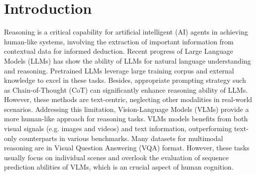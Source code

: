 \documentclass[11pt]{article}
\newcommand{\MY}[1]{\textcolor{orange}{(Mengyue: #1})}
\begin{document}
\section{Introduction}


Reasoning is a critical capability for artificial intelligent (AI) agents in achieving human-like systems, involving the extraction of important information from contextual data for informed deduction. Recent progress of Large Language Models (LLMs) has show the ability of LLMs for natural language understanding and reasoning\citep{brown2020language,liu2022rainier,jung2022maieutic,khot2022decomposed,qiao2022reasoning}. Pretrained LLMs leverage large training corpus and external knowledge to excel in these tasks. Besides, appropriate prompting strategy such as Chain-of-Thought (CoT)\citep{wei2022chain} can significantly enhance reasoning ability of LLMs. However, these methods are text-centric, neglecting other modalities in real-world scenarios. Addressing this limitation, Vision-Language Models (VLMs) provide a more human-like approach for reasoning tasks\citep{li2023blip,song2022clip,kim2021vilt}. VLMs models benefits from both visual signals (e.g. images and videos) and text information, outperforming text-only counterparts in various benchmarks. Many datasets for multimodal reasoning are in Visual Question Answering (VQA) format\citep{lu2022learn,johnson2017clevr}. However, these tasks usually focus on individual scenes and overlook the evaluation of sequence prediction abilities of VLMs, which is an crucial aspect of human cognition. 
\end{document}
